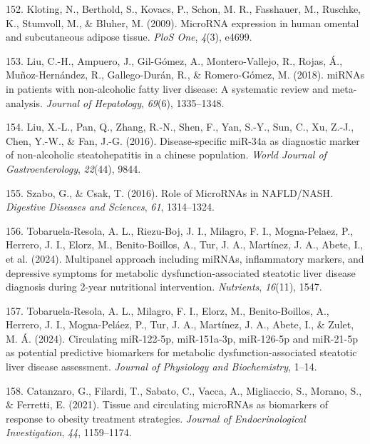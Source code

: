 \documentclass[
  11pt,
  letterpaper,
]{book}
\newlength{\cslhangindent}
\newenvironment{CSLReferences}[2] %
 {\begin{list}{}{%
  \setlength{\itemindent}{0pt}
  \setlength{\leftmargin}{0pt}
  \setlength{\parsep}{0pt}
  \ifodd #1
   \setlength{\leftmargin}{\cslhangindent}
   \setlength{\itemindent}{-1\cslhangindent}
  \fi
  \setlength{\itemsep}{#2\baselineskip}}}
 {\end{list}}
\begin{document}
\begin{CSLReferences}{1}{0}
152. Kloting, N., Berthold, S., Kovacs, P., Schon, M. R., Fasshauer, M.,
Ruschke, K., Stumvoll, M., \& Bluher, M. (2009). MicroRNA expression in
human omental and subcutaneous adipose tissue. \emph{PloS One},
\emph{4}(3), e4699.

153. Liu, C.-H., Ampuero, J., Gil-Gómez, A., Montero-Vallejo, R., Rojas,
Á., Muñoz-Hernández, R., Gallego-Durán, R., \& Romero-Gómez, M. (2018).
miRNAs in patients with non-alcoholic fatty liver disease: A systematic
review and meta-analysis. \emph{Journal of Hepatology}, \emph{69}(6),
1335--1348.

154. Liu, X.-L., Pan, Q., Zhang, R.-N., Shen, F., Yan, S.-Y., Sun, C.,
Xu, Z.-J., Chen, Y.-W., \& Fan, J.-G. (2016). Disease-specific miR-34a
as diagnostic marker of non-alcoholic steatohepatitis in a chinese
population. \emph{World Journal of Gastroenterology}, \emph{22}(44),
9844.

155. Szabo, G., \& Csak, T. (2016). Role of MicroRNAs in NAFLD/NASH.
\emph{Digestive Diseases and Sciences}, \emph{61}, 1314--1324.

156. Tobaruela-Resola, A. L., Riezu-Boj, J. I., Milagro, F. I.,
Mogna-Pelaez, P., Herrero, J. I., Elorz, M., Benito-Boillos, A., Tur, J.
A., Martínez, J. A., Abete, I., et al. (2024). Multipanel approach
including miRNAs, inflammatory markers, and depressive symptoms for
metabolic dysfunction-associated steatotic liver disease diagnosis
during 2-year nutritional intervention. \emph{Nutrients}, \emph{16}(11),
1547.

157. Tobaruela-Resola, A. L., Milagro, F. I., Elorz, M., Benito-Boillos,
A., Herrero, J. I., Mogna-Peláez, P., Tur, J. A., Martínez, J. A.,
Abete, I., \& Zulet, M. Á. (2024). Circulating miR-122-5p, miR-151a-3p,
miR-126-5p and miR-21-5p as potential predictive biomarkers for
metabolic dysfunction-associated steatotic liver disease assessment.
\emph{Journal of Physiology and Biochemistry}, 1--14.

158. Catanzaro, G., Filardi, T., Sabato, C., Vacca, A., Migliaccio, S.,
Morano, S., \& Ferretti, E. (2021). Tissue and circulating microRNAs as
biomarkers of response to obesity treatment strategies. \emph{Journal of
Endocrinological Investigation}, \emph{44}, 1159--1174.


\end{CSLReferences}
\end{document}
